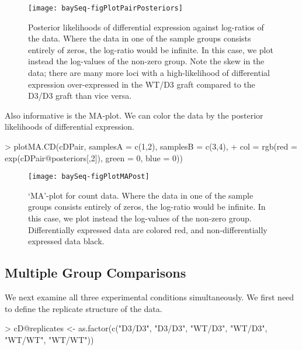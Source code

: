 \documentclass[a4paper]{article}
\begin{document}
\begin{figure}[!ht]
\begin{center}
\texttt{[image: baySeq-figPlotPairPosteriors]}
\caption{Posterior likelihoods of differential expression against log-ratios of the data. Where the data in one of the sample groups consists entirely of zeros, the log-ratio would be infinite. In this case, we plot instead the log-values of the non-zero group. Note the skew in the data; there are many more loci with a high-likelihood of differential expression over-expressed in the WT/D3 graft compared to the D3/D3 graft than vice versa.}
\label{figMAPost}
\end{center}
\end{figure}


 Also informative is the MA-plot. We can color the data by the posterior likelihoods of differential expression.
\begin{Schunk}
\begin{Sinput}
> plotMA.CD(cDPair, samplesA = c(1,2), samplesB = c(3,4),
+           col = rgb(red = exp(cDPair@posteriors[,2]), green = 0, blue = 0))
\end{Sinput}
\end{Schunk}

\begin{figure}[!ht]
\begin{center}
\texttt{[image: baySeq-figPlotMAPost]}
\caption{`MA'-plot for count data. Where the data in one of the sample groups consists entirely of zeros, the log-ratio would be infinite. In this case, we plot instead the log-values of the non-zero group. Differentially expressed data are colored red, and non-differentially expressed data black.}
\label{figMAPost}
\end{center}
\end{figure}


\subsection{Multiple Group Comparisons}

We next examine all three experimental conditions simultaneously. We first need to define the replicate structure of the data.
\begin{Schunk}
\begin{Sinput}
> cD@replicates <- as.factor(c("D3/D3", "D3/D3", "WT/D3", "WT/D3", "WT/WT", "WT/WT"))
\end{Sinput}
\end{Schunk}
\end{document}
